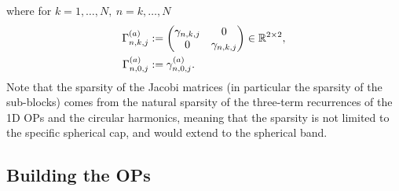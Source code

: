 \documentclass[11pt, oneside]{article}   	%
\begin{document}
where for $k = 1,\dots,N, \: n = k,\dots,N$
\begin{align}
	\Gamma^{(a)}_{n,k,j} &:= 
		\begin{pmatrix}
			\gamma_{n,k,j} & 0 \\
			0 & \gamma_{n,k,j}
		\end{pmatrix} \in \mathbb{R}^{2\times2}, \label{eqn:jacobisubblocksGamma1} \\
	\Gamma^{(a)}_{n,0,j} &:= \gamma^{(a)}_{n,0,j}. \label{eqn:jacobisubblocksGamma2}
\end{align}
Note that the sparsity of the Jacobi matrices (in particular the sparsity of the sub-blocks) comes from the natural sparsity of the three-term recurrences of the 1D OPs and the circular harmonics, meaning that the sparsity is not limited to the specific spherical cap, and would extend to the spherical band.


\subsection{Building the OPs} 
\end{document}
